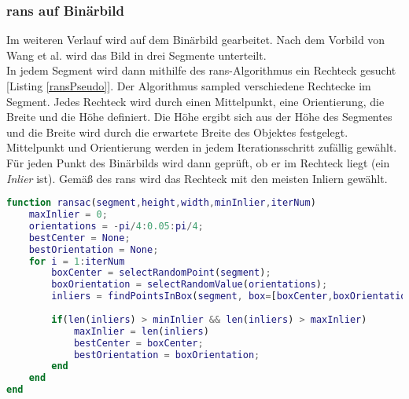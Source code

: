 \subsubsection{\gls{rans} auf Binärbild}
Im weiteren Verlauf wird auf dem  Binärbild gearbeitet. Nach dem Vorbild von Wang et al. \cite{wang2004lane} wird das Bild in drei Segmente unterteilt.\\
In jedem Segment wird dann mithilfe des \gls{rans}-Algorithmus ein Rechteck gesucht [Listing \ref{ransPseudo}]. Der Algorithmus sampled verschiedene Rechtecke im Segment. Jedes Rechteck wird durch einen Mittelpunkt, eine Orientierung, die Breite und die Höhe definiert. Die Höhe ergibt sich aus der Höhe des Segmentes und die Breite wird durch die erwartete Breite des Objektes festgelegt. Mittelpunkt und Orientierung werden in jedem Iterationsschritt zufällig gewählt.\\
Für jeden Punkt des Binärbilds wird dann geprüft, ob er im Rechteck liegt (ein \textit{Inlier} ist). Gemäß des \gls{rans} wird das Rechteck mit den meisten Inliern gewählt.\\
\begin{lstlisting}[language=Matlab,caption={Eingesetzter \gls{rans} als Pseudocode.},label=ransPseudo]
function ransac(segment,height,width,minInlier,iterNum)
	maxInlier = 0;
	orientations = -pi/4:0.05:pi/4;
	bestCenter = None;
	bestOrientation = None;
	for i = 1:iterNum
		boxCenter = selectRandomPoint(segment);
		boxOrientation = selectRandomValue(orientations);
		inliers = findPointsInBox(segment, box=[boxCenter,boxOrientation,height,width]);
		
		if(len(inliers) > minInlier && len(inliers) > maxInlier)
			maxInlier = len(inliers)
			bestCenter = boxCenter;
			bestOrientation = boxOrientation;
		end
	end
end
\end{lstlisting}

